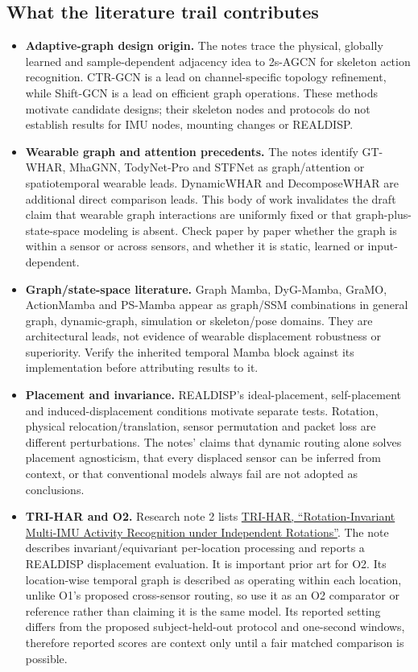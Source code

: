 \documentclass[10pt,a4paper]{article}
\begin{document}
\subsection{What the literature trail contributes}
\begin{itemize}
\item \textbf{Adaptive-graph design origin.} The notes trace the physical, globally learned and sample-dependent adjacency idea to 2s-AGCN for skeleton action recognition. CTR-GCN is a lead on channel-specific topology refinement, while Shift-GCN is a lead on efficient graph operations. These methods motivate candidate designs; their skeleton nodes and protocols do not establish results for IMU nodes, mounting changes or REALDISP.
\item \textbf{Wearable graph and attention precedents.} The notes identify GT-WHAR, MhaGNN, TodyNet-Pro and STFNet as graph/attention or spatiotemporal wearable leads. DynamicWHAR and DecomposeWHAR are additional direct comparison leads. This body of work invalidates the draft claim that wearable graph interactions are uniformly fixed or that graph-plus-state-space modeling is absent. Check paper by paper whether the graph is within a sensor or across sensors, and whether it is static, learned or input-dependent.
\item \textbf{Graph/state-space literature.} Graph Mamba, DyG-Mamba, GraMO, ActionMamba and PS-Mamba appear as graph/SSM combinations in general graph, dynamic-graph, simulation or skeleton/pose domains. They are architectural leads, not evidence of wearable displacement robustness or superiority. Verify the inherited temporal Mamba block against its implementation before attributing results to it.
\item \textbf{Placement and invariance.} REALDISP's ideal-placement, self-placement and induced-displacement conditions motivate separate tests. Rotation, physical relocation/translation, sensor permutation and packet loss are different perturbations. The notes' claims that dynamic routing alone solves placement agnosticism, that every displaced sensor can be inferred from context, or that conventional models always fail are not adopted as conclusions.
\item \textbf{TRI-HAR and O2.} Research note 2 lists \href{https://arxiv.org/abs/2608.15621}{TRI-HAR, ``Rotation-Invariant Multi-IMU Activity Recognition under Independent Rotations''}. The note describes invariant/equivariant per-location processing and reports a REALDISP displacement evaluation. It is important prior art for O2. Its location-wise temporal graph is described as operating within each location, unlike O1's proposed cross-sensor routing, so use it as an O2 comparator or reference rather than claiming it is the same model. Its reported setting differs from the proposed subject-held-out protocol and one-second windows, therefore reported scores are context only until a fair matched comparison is possible.

\end{itemize}
\end{document}

